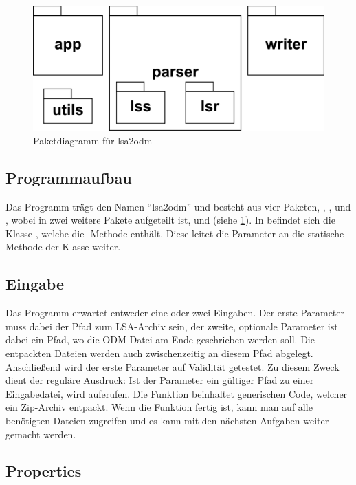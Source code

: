 \begin{figure}[h]
	\centering
	\includegraphics[width=.60\textwidth]{./img/i_package.png}
	\caption{Paketdiagramm für lsa2odm}
	\label{fig:package}
\end{figure}

\subsection{Programmaufbau}

Das Programm trägt den Namen \enquote{lsa2odm} und besteht aus vier Paketen, , ,  und , wobei  in zwei weitere Pakete aufgeteilt ist,  und  (siehe \cref{fig:package}).
In  befindet sich die Klasse , welche die -Methode enthält.
Diese leitet die Parameter an die statische Methode  der Klasse  weiter.

\subsection{Eingabe}

Das Programm erwartet entweder eine oder zwei Eingaben. Der erste Parameter muss dabei der Pfad zum LSA-Archiv sein, der zweite, optionale Parameter ist dabei ein Pfad, wo die ODM-Datei am Ende geschrieben werden soll.
Die entpackten Dateien werden auch zwischenzeitig an diesem Pfad abgelegt.
Anschließend wird der erste Parameter auf Validität getestet.
Zu diesem Zweck dient der reguläre Ausdruck:
\noindent Ist der Parameter ein gültiger Pfad zu einer Eingabedatei, wird  auferufen.
Die Funktion beinhaltet generischen Code, welcher ein Zip-Archiv entpackt.
Wenn die Funktion fertig ist, kann man auf alle benötigten Dateien zugreifen und es kann mit den nächsten Aufgaben weiter gemacht werden.

\subsection{Properties}

